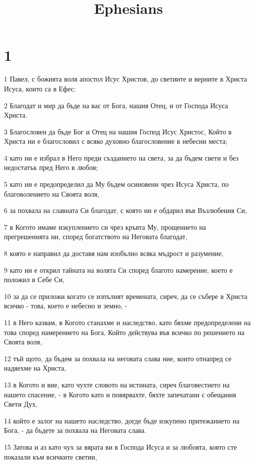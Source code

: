 

\title{Ephesians}


\chapter{1}

\par 1 Павел, с божията воля апостол Исус Христов, до светиите и верните в Христа Исуса, които са в Ефес:
\par 2 Благодат и мир да бъде на вас от Бога, нашия Отец, и от Господа Исуса Христа.
\par 3 Благословен да бъде Бог и Отец на нашия Господ Исус Христос, Който в Христа ни е благословил с всяко духовно благословение в небесни места;
\par 4 като ни е избрал в Него преди създанието на света, за да бъдем свети и без недостатък пред Него в любов;
\par 5 като ни е предопределил да Му бъдем осиновени чрез Исуса Христа, по благоволението на Своята воля,
\par 6 за похвала на славната Си благодат, с която ни е обдарил във Възлюбения Си,
\par 7 в Когото имаме изкуплението си чрез кръвта Му, прощението на прегрешенията ни, според богатството на Неговата благодат,
\par 8 която е направил да доставя нам изобълно всяка мъдрост и разумение,
\par 9 като ни е открил тайната на волята Си според благото намерение, което е положил в Себе Си,
\par 10 за да се приложи когато се изпълнят времената, сиреч, да се събере в Христа всичко - това, което е небесно и земно, -
\par 11 в Него казвам, в Когото станахме и наследство, като бяхме предопределени на това според намерението на Бога, Който действува във всичко по решението на Своята воля,
\par 12 тъй щото, да бъдем за похвала на неговата слава ние, които отнапред се надяехме на Христа,
\par 13 в Когото и вие, като чухте словото на истината, сиреч благовестието на нашето спасение, - в Когото като и повярвахте, бяхте запечатани с обещания Свети Дух,
\par 14 който е залог на нашето наследство, догде бъде изкупено притежанието на Бога, - да бъдете за похвала на Неговата слава.
\par 15 Затова и аз като чух за вярата ви в Господа Исуса и за любовта, която сте показали към всичките светии,

